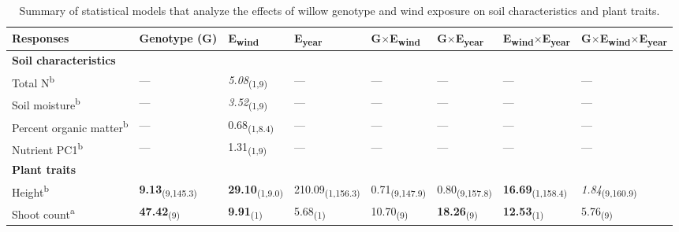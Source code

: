 \documentclass[11pt]{article}
\begin{document}
\begin{table}
\centering
\caption{Summary of statistical models that analyze the
effects of willow genotype and wind exposure on
soil characteristics and plant traits.}
\label{wSoilTrait}
\begin{tabular}{@{}llllllll@{}}
\toprule
Responses                  & Genotype (G)  & E\textsubscript{wind}        & E\textsubscript{year}           & G$\times$E\textsubscript{wind}       & G$\times$E\textsubscript{year}       & E\textsubscript{wind}$\times$E\textsubscript{year}    & G$\times$E\textsubscript{wind}$\times$E\textsubscript{year} \\
\midrule
\textbf{Soil characteristics}       &               &              &                 &               &               &                &               \\
Total N\textsuperscript{b}                   & ---             & \textit{5.08}\textsubscript{(1,9)}    & ---               & ---             & ---             & ---              & ---             \\
Soil moisture\textsuperscript{b}             & ---             & \textit{3.52}\textsubscript{(1,9)}    & ---               & ---             & ---             & ---              & ---             \\
Percent organic matter\textsuperscript{b}    & ---             & 0.68\textsubscript{(1,8.4)}  & ---               & ---             & ---             & ---              & ---             \\
Nutrient PC1\textsuperscript{b}              & ---             & 1.31\textsubscript{(1,9)}    & ---               & ---             & ---             & ---              & ---             \\
\textbf{Plant traits}               &               &              &                 &               &               &                &               \\
Height\textsuperscript{b}                    & \textbf{9.13}\textsubscript{(9,145.3)} & \textbf{29.10}\textsubscript{(1,9.0)} & 210.09\textsubscript{(1,156.3)} & 0.71\textsubscript{(9,147.9)} & 0.80\textsubscript{(9,157.8)} & \textbf{16.69}\textsubscript{(1,158.4)} & \textit{1.84}\textsubscript{(9,160.9)} \\
Shoot count\textsuperscript{a}               & \textbf{47.42}\textsubscript{(9)}      & \textbf{9.91}\textsubscript{(1)}      & 5.68\textsubscript{(1)}         & 10.70\textsubscript{(9)}      & \textbf{18.26}\textsubscript{(9)}      & \textbf{12.53}\textsubscript{(1)}       & 5.76\textsubscript{(9)}       \\

\end{tabular}
\end{table}
\end{document}
